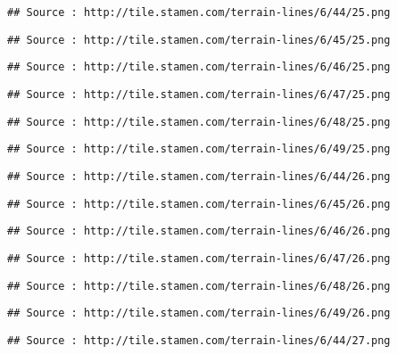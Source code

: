 \documentclass[
]{article}
\begin{document}
\begin{verbatim}
## Source : http://tile.stamen.com/terrain-lines/6/44/25.png
\end{verbatim}

\begin{verbatim}
## Source : http://tile.stamen.com/terrain-lines/6/45/25.png
\end{verbatim}

\begin{verbatim}
## Source : http://tile.stamen.com/terrain-lines/6/46/25.png
\end{verbatim}

\begin{verbatim}
## Source : http://tile.stamen.com/terrain-lines/6/47/25.png
\end{verbatim}

\begin{verbatim}
## Source : http://tile.stamen.com/terrain-lines/6/48/25.png
\end{verbatim}

\begin{verbatim}
## Source : http://tile.stamen.com/terrain-lines/6/49/25.png
\end{verbatim}

\begin{verbatim}
## Source : http://tile.stamen.com/terrain-lines/6/44/26.png
\end{verbatim}

\begin{verbatim}
## Source : http://tile.stamen.com/terrain-lines/6/45/26.png
\end{verbatim}

\begin{verbatim}
## Source : http://tile.stamen.com/terrain-lines/6/46/26.png
\end{verbatim}

\begin{verbatim}
## Source : http://tile.stamen.com/terrain-lines/6/47/26.png
\end{verbatim}

\begin{verbatim}
## Source : http://tile.stamen.com/terrain-lines/6/48/26.png
\end{verbatim}

\begin{verbatim}
## Source : http://tile.stamen.com/terrain-lines/6/49/26.png
\end{verbatim}

\begin{verbatim}
## Source : http://tile.stamen.com/terrain-lines/6/44/27.png
\end{verbatim}
\end{document}
